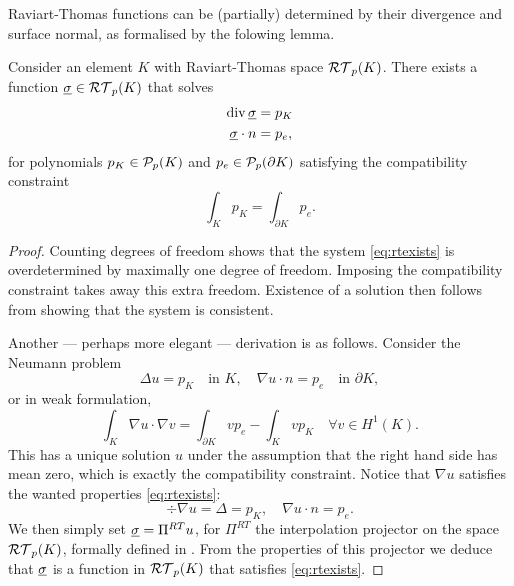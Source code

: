 \documentclass[thesis.tex]{subfiles}
\begin{document}
Raviart-Thomas functions can be (partially) determined by their divergence and surface normal, as formalised by the folowing lemma.
\begin{lem}
  \label{lem:rtexists}
  Consider an element $K$ with Raviart-Thomas space $\RT_p(K)$.
  There exists a function $\vsig \in \RT_p(K)$ that  solves
  \begin{equation}
    \label{eq:rtexists}
  \begin{aligned}
    \div\vsig &= p_K\\
    \vsig \cdot n &= p_e,
  \end{aligned}
\end{equation}
  for polynomials $p_K \in \P_p(K)$ and $p_{e} \in \P_p(\partial K)$ satisfying
  the compatibility constraint
  \[
    \int_K p_K = \int_{\partial K} p_e.
  \]
\end{lem}
\begin{proof}
  Counting degrees of freedom shows that the system \eqref{eq:rtexists} is overdetermined by maximally one degree of freedom. Imposing
  the compatibility constraint takes away this extra freedom. Existence of a solution then follows from showing that the system is consistent.

  Another --- perhaps more elegant --- derivation is as follows. Consider the Neumann problem
  \[
    \Delta u = p_K \quad \text{in } K, \quad \nabla u\cdot n = p_e \quad \text{in } \partial K,
  \]
  or in weak formulation,
  \[
    \int_K \nabla u \cdot \nabla v = \int_{\partial K} v p_e - \int_K vp_K \quad \forall v \in H^1(K).
  \]
  This has a unique solution $u$ under the assumption that the right hand side has mean zero, which is exactly the compatibility constraint.
  Notice that $\nabla u$ satisfies the wanted properties \eqref{eq:rtexists}:
  \[
    \div \nabla u = \Delta = p_K, \quad \nabla u \cdot n = p_e.
  \]
  We then simply set $\vsig = \Pi^{RT} u$, for $\Pi^{RT}$ the interpolation projector on the space $\RT_p(K)$,
  formally defined in \cite[\S3.4]{brezzimixed}. From the properties of this projector \cite[Lem~3.7]{brezzimixed} we
  deduce that $\vsig$ is a function in $\RT_p(K)$ that satisfies \eqref{eq:rtexists}.
\end{proof}
\end{document}
